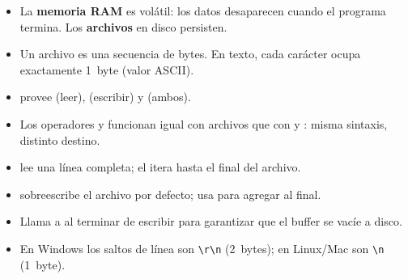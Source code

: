 \documentclass[12pt, oneside]{article}
\begin{document}
\begin{itemize}
  \item La \textbf{memoria RAM} es volátil: los datos desaparecen cuando
        el programa termina.  Los \textbf{archivos} en disco persisten.
  \item Un archivo es una secuencia de bytes.  En texto, cada carácter
        ocupa exactamente 1~byte (valor ASCII).
  \item {} provee  (leer), 
        (escribir) y  (ambos).
  \item Los operadores \cpp{>>} y \cpp{<<} funcionan igual con archivos
        que con  y : misma sintaxis, distinto destino.
  \item {} lee una línea completa; el
         itera hasta el final del archivo.
  \item {} sobreescribe el archivo por defecto; usa
         para agregar al final.
  \item Llama a  al terminar de escribir para garantizar
        que el buffer se vacíe a disco.
  \item En Windows los saltos de línea son \texttt{\textbackslash r\textbackslash n}
        (2~bytes); en Linux/Mac son \texttt{\textbackslash n} (1~byte).
\end{itemize}
\end{document}
